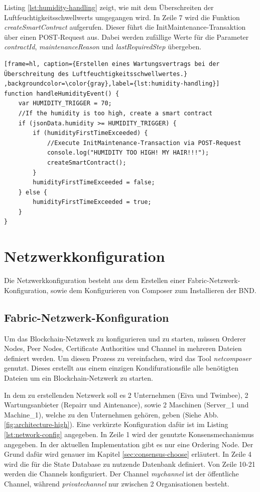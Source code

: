 Listing \ref{lst:humidity-handling} zeigt, wie mit dem Überschreiten der Luftfeuchtigkeitsschwellwerts umgegangen wird. In Zeile 7 wird die Funktion \textit{createSmartContract} aufgerufen. Dieser führt die InitMaintenance-Transaktion über einen POST-Request aus. Dabei werden zufällige Werte für die Parameter \textit{contractId}, \textit{maintenanceReason} und \textit{lastRequiredStep} übergeben.

\begin{lstfloat}
\begin{lstlisting}[frame=hl, caption={Erstellen eines Wartungsvertrags bei der Überschreitung des Luftfeuchtigkeitsschwellwertes.} ,backgroundcolor=\color{gray},label={lst:humidity-handling}]
function handleHumidityEvent() {
    var HUMIDITY_TRIGGER = 70;
    //If the humidity is too high, create a smart contract
    if (jsonData.humidity >= HUMIDITY_TRIGGER) {
        if (humidityFirstTimeExceeded) {
            //Execute InitMaintenance-Transaction via POST-Request
            console.log("HUMIDITY TOO HIGH! MY HAIR!!!");
            createSmartContract(); 
        }
        humidityFirstTimeExceeded = false;
    } else {
        humidityFirstTimeExceeded = true;
    }
}
\end{lstlisting} 
\end{lstfloat}

\section{Netzwerkkonfiguration}
\label{sec:network-config}
Die Netzwerkkonfiguration besteht aus dem Erstellen einer Fabric-Netzwerk-Konfiguration, sowie dem Konfigurieren von Composer zum Installieren der BND. 

\subsection{Fabric-Netzwerk-Konfiguration}
Um das Blockchain-Netzwerk zu konfigurieren und zu starten, müssen Orderer Nodes, Peer Nodes, Certificate Authorities und Channel in mehreren Dateien definiert werden. Um diesen Prozess zu vereinfachen, wird das Tool \textit{netcomposer} \cite{IBMSilvergateTeamnetcomposerGithubRepository2018} genutzt. Dieses erstellt aus einem einzigen Kondifurationsfile alle benötigten Dateien um ein Blockchain-Netzwerk zu starten. 

In dem zu erstellenden Netzwerk soll es 2 Unternehmen (Eiva und Twimbee), 2 Wartungsanbieter (Repairr und Aintenance), sowie 2 Maschinen (Server\_1 und Machine\_1), welche zu den Unternehmen gehören, geben (Siehe Abb. \ref{fig:architecture-high}). Eine verkürzte Konfiguration dafür ist im Listing \ref{lst:network-config} angegeben. In Zeile 1 wird der genutzte Konsensmechanismus angegeben. In der aktuellen Implementation gibt es nur eine Ordering Node. Der Grund dafür wird genauer im Kapitel \ref{sec:consensus-choose} erläutert. In Zeile 4 wird die für die State Database zu nutzende Datenbank definiert. Von Zeile 10-21 werden die Channels konfiguriert. Der Channel \textit{mychannel} ist der öffentliche Channel, während \textit{privatechannel} nur zwischen 2 Organisationen besteht. 

